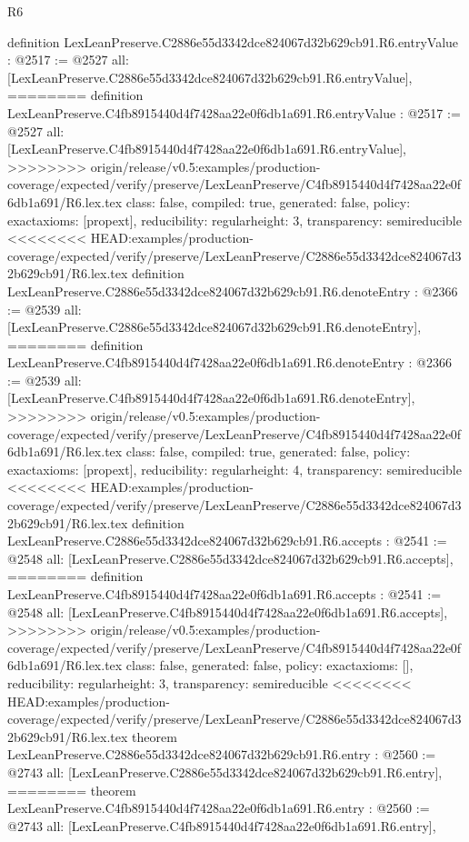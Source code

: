 \begin{lexlean}{R6}
\begin{coremodule}
{{{{{{{{{{{{{{definition LexLeanPreserve.C2886e55d3342dce824067d32b629cb91.R6.entryValue : @2517 := @2527 {
  all: [LexLeanPreserve.C2886e55d3342dce824067d32b629cb91.R6.entryValue],
========
definition LexLeanPreserve.C4fb8915440d4f7428aa22e0f6db1a691.R6.entryValue : @2517 := @2527 {
  all: [LexLeanPreserve.C4fb8915440d4f7428aa22e0f6db1a691.R6.entryValue],
>>>>>>>> origin/release/v0.5:examples/production-coverage/expected/verify/preserve/LexLeanPreserve/C4fb8915440d4f7428aa22e0f6db1a691/R6.lex.tex
  class: false,
  compiled: true,
  generated: false,
  policy: exact{axioms: [propext]},
  reducibility: regular{height: 3},
  transparency: semireducible
}
<<<<<<<< HEAD:examples/production-coverage/expected/verify/preserve/LexLeanPreserve/C2886e55d3342dce824067d32b629cb91/R6.lex.tex
definition LexLeanPreserve.C2886e55d3342dce824067d32b629cb91.R6.denoteEntry : @2366 := @2539 {
  all: [LexLeanPreserve.C2886e55d3342dce824067d32b629cb91.R6.denoteEntry],
========
definition LexLeanPreserve.C4fb8915440d4f7428aa22e0f6db1a691.R6.denoteEntry : @2366 := @2539 {
  all: [LexLeanPreserve.C4fb8915440d4f7428aa22e0f6db1a691.R6.denoteEntry],
>>>>>>>> origin/release/v0.5:examples/production-coverage/expected/verify/preserve/LexLeanPreserve/C4fb8915440d4f7428aa22e0f6db1a691/R6.lex.tex
  class: false,
  compiled: true,
  generated: false,
  policy: exact{axioms: [propext]},
  reducibility: regular{height: 4},
  transparency: semireducible
}
<<<<<<<< HEAD:examples/production-coverage/expected/verify/preserve/LexLeanPreserve/C2886e55d3342dce824067d32b629cb91/R6.lex.tex
definition LexLeanPreserve.C2886e55d3342dce824067d32b629cb91.R6.accepts : @2541 := @2548 {
  all: [LexLeanPreserve.C2886e55d3342dce824067d32b629cb91.R6.accepts],
========
definition LexLeanPreserve.C4fb8915440d4f7428aa22e0f6db1a691.R6.accepts : @2541 := @2548 {
  all: [LexLeanPreserve.C4fb8915440d4f7428aa22e0f6db1a691.R6.accepts],
>>>>>>>> origin/release/v0.5:examples/production-coverage/expected/verify/preserve/LexLeanPreserve/C4fb8915440d4f7428aa22e0f6db1a691/R6.lex.tex
  class: false,
  generated: false,
  policy: exact{axioms: []},
  reducibility: regular{height: 3},
  transparency: semireducible
}
<<<<<<<< HEAD:examples/production-coverage/expected/verify/preserve/LexLeanPreserve/C2886e55d3342dce824067d32b629cb91/R6.lex.tex
theorem LexLeanPreserve.C2886e55d3342dce824067d32b629cb91.R6.entry : @2560 := @2743 {
  all: [LexLeanPreserve.C2886e55d3342dce824067d32b629cb91.R6.entry],
========
theorem LexLeanPreserve.C4fb8915440d4f7428aa22e0f6db1a691.R6.entry : @2560 := @2743 {
  all: [LexLeanPreserve.C4fb8915440d4f7428aa22e0f6db1a691.R6.entry],
}}}}}}}}}}}}}}}}}}}
\end{coremodule}
\end{lexlean}
